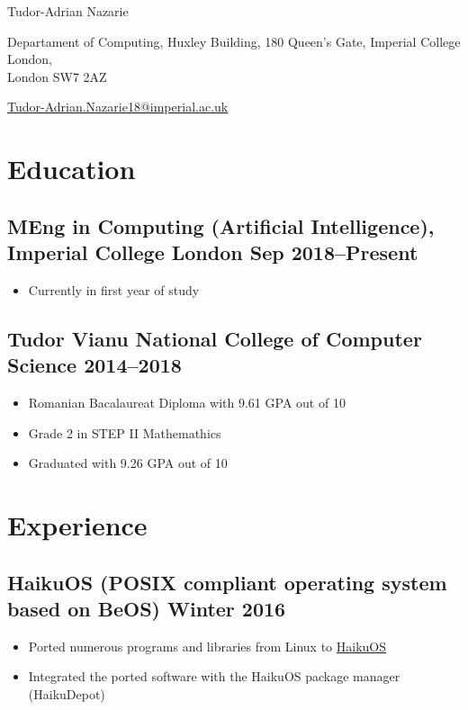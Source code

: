 \documentclass[a4paper]{article}
\begin{document}
\begin{center}
	{\huge\sffamily Tudor-Adrian Nazarie}

	\vspace{4pt}

	Departament of Computing, Huxley Building, 180 Queen's Gate, Imperial
	College London,\\ London SW7 2AZ

	\vspace{4pt}

	\href{mailto:tudor-adrian.nazarie18@imperial.ac.uk}{Tudor-Adrian.Nazarie18@imperial.ac.uk}

	\vspace{-12pt}
\end{center}

\section*{Education}
\subsection*{MEng in Computing (Artificial Intelligence), Imperial College
London \hfill Sep 2018--Present}
\begin{itemize}
	\item Currently in first year of study
\end{itemize}

\subsection*{Tudor Vianu National College of Computer Science \hfill
2014--2018}
\begin{itemize}
	\item Romanian Bacalaureat Diploma with 9.61 GPA out of 10
	\item Grade 2 in STEP II Mathemathics
	\item Graduated with 9.26 GPA out of 10
\end{itemize}

\section*{Experience}
\subsection*{HaikuOS (POSIX compliant operating system based on BeOS) \hfill Winter 2016}
\begin{itemize}
	\item Ported numerous programs and libraries from Linux to \href{https://www.haiku-os.org/}{HaikuOS}
	\item Integrated the ported software with the HaikuOS package manager
		(HaikuDepot)
\end{itemize}
\end{document}
